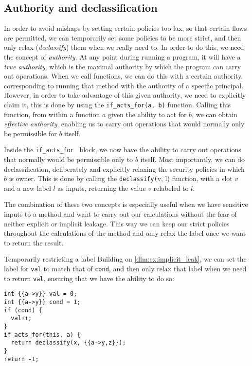 \newcommand{\dlmactsfor}{\texttt{if\_acts\_for}}
\newcommand{\dlmdeclassify}{\texttt{declassify}}

\subsection{Authority and declassification}
In order to avoid mishaps by setting certain policies too lax, so that certain flows are permitted, we can temporarily set some policies to be more strict, and then only relax (\emph{declassify}) them when we really need to.
In order to do this, we need the concept of \emph{authority}.
At any point during running a program, it will have a \emph{true authority}, which is the maximal authority by which the program can carry out operations.
When we call functions, we can do this with a certain authority, corresponding to running that method with the authority of a specific principal.
However, in order to take advantage of this given authority, we need to explicitly claim it, this is done by using the \dlmactsfor\texttt{(a, b)} function.
Calling this function, from within a function $a$ given the ability to act for $b$, we can obtain \emph{effective authority}, enabling us to carry out operations that would normally only be permissible for $b$ itself.

Inside the \dlmactsfor~ block, we now have the ability to carry out operations that normally would be permissible only to $b$ itself.
Most importantly, we can do declassification, deliberately and explicitly relaxing the security policies in which $b$ is owner.
This is done by calling the \dlmdeclassify\texttt(v, l) function, with a slot $v$ and a new label $l$ as inputs, returning the value $v$ relabeled to $l$.

The combination of these two concepts is especially useful when we have sensitive inputs to a method and want to carry out our calculations without the fear of neither explicit or implicit leakage.
This way we can keep our strict policies throughout the calculations of the method and only relax the label once we want to return the result.

\begin{example}{Temporarily restricting a label}
  Building on \cref{dlm:ex:implicit_leak}, we can set the label for \texttt{val} to match that of \texttt{cond}, and then only relax that label when we need to return \texttt{val}, ensuring that we have the ability to do so:
  \begin{lstlisting}[style=dlmc]
int {{a->y}} val = 0;
int {{a->y}} cond = 1;
if (cond) {
  val++;
}
if_acts_for(this, a) {
  return declassify(x, {{a->y,z}});
}
return -1;
  \end{lstlisting}
\end{example}

